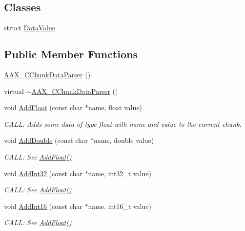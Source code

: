\subsection*{Classes}
\begin{DoxyCompactItemize}
\item 
struct \hyperlink{a00144}{Data\+Value}
\end{DoxyCompactItemize}
\subsection*{Public Member Functions}
\begin{DoxyCompactItemize}
\item 
\hyperlink{a00014_acf61d78b965c04e6af597379edad5a39}{A\+A\+X\+\_\+\+C\+Chunk\+Data\+Parser} ()
\item 
virtual \hyperlink{a00014_a4a31f21eaad9742482051f05f08fb72b}{$\sim$\+A\+A\+X\+\_\+\+C\+Chunk\+Data\+Parser} ()
\item 
void \hyperlink{a00014_aa85606ec7ad6e142abceb1097dcd2480}{Add\+Float} (const char $\ast$name, float value)
\begin{DoxyCompactList}\small\item\em C\+A\+L\+L\+: Adds some data of type float with {\itshape name} and {\itshape value} to the current chunk. \end{DoxyCompactList}\item 
void \hyperlink{a00014_a3dc9ec20551559ac3bdae8bf981ace8a}{Add\+Double} (const char $\ast$name, double value)
\begin{DoxyCompactList}\small\item\em C\+A\+L\+L\+: See \hyperlink{a00014_aa85606ec7ad6e142abceb1097dcd2480}{Add\+Float()} \end{DoxyCompactList}\item 
void \hyperlink{a00014_a6000b5c93362f3fe35d59d197f340306}{Add\+Int32} (const char $\ast$name, int32\+\_\+t value)
\begin{DoxyCompactList}\small\item\em C\+A\+L\+L\+: See \hyperlink{a00014_aa85606ec7ad6e142abceb1097dcd2480}{Add\+Float()} \end{DoxyCompactList}\item 
void \hyperlink{a00014_a06541319eb6f0628d33518b0485cd8cc}{Add\+Int16} (const char $\ast$name, int16\+\_\+t value)
\begin{DoxyCompactList}\small\item\em C\+A\+L\+L\+: See \hyperlink{a00014_aa85606ec7ad6e142abceb1097dcd2480}{Add\+Float()} \end{DoxyCompactList}\item 

\end{DoxyCompactItemize}
